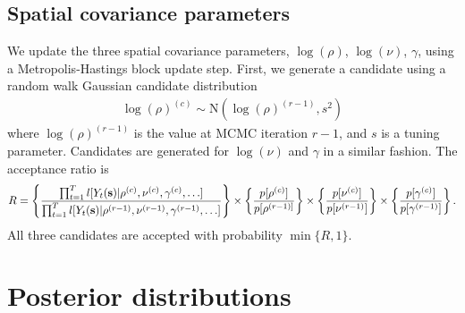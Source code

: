 \documentclass[useAMS,usenatbib,referee]{biomweb}
\begin{document}
\subsection*{Spatial covariance parameters}
We update the three spatial covariance parameters, $\log(\rho)$, $\log(\nu)$, $\gamma$, using a Metropolis-Hastings block update step.
First, we generate a candidate using a random walk Gaussian candidate distribution
\begin{align*}
	\log(\rho)^{(c)} \sim \text{N}(\log(\rho)^{(r - 1)}, s^2)
\end{align*}
where $\log(\rho)^{(r-1)}$ is the value at MCMC iteration $r - 1$, and $s$ is a tuning parameter.
Candidates are generated for $\log(\nu)$ and $\gamma$ in a similar fashion.
The acceptance ratio is
\begin{align*}
	R = \left\{ \frac{ \prod_{t = 1}^{T} l[Y_t(\mbox{\bf s}) | \rho^{(c)}, \nu^{(c)}, \gamma^{(c)}, \ldots] }{\prod_{t = 1}^{T} l[Y_t(\mbox{\bf s}) | \rho^{(r-1)}, \nu^{(r-1)}, \gamma^{(r-1)}, \ldots] } \right\} \times \left\{ \frac{ p[\rho^{(c)}] }{ p[\rho^{(r - 1)] } } \right\} \times \left\{ \frac{ p[\nu^{(c)}] }{ p[\nu^{(r - 1)}] } \right\} \times \left\{ \frac{ p[ \gamma^{(c)} ] }{ p[\gamma^{(r - 1)} ] } \right\}.
\end{align*}
All three candidates are accepted with probability $\min\{R, 1\}$.

\section{Posterior distributions} \label{a:posterior}
\end{document}

